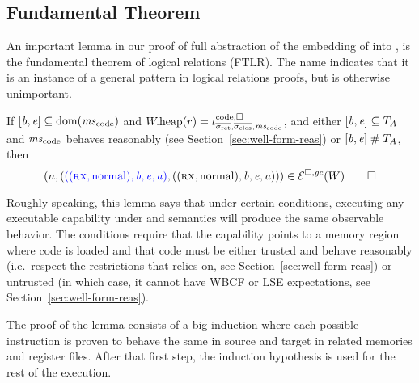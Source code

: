 \subsection{Fundamental Theorem}
An important lemma in our proof of full abstraction of the embedding of \srccm{} into \trgcm{}, is the fundamental theorem of logical relations (FTLR).
The name indicates that it is an instance of a general pattern in logical relations proofs, but is otherwise unimportant.
\begin{lemma}
  \label{thm:ftlr}
  If $[\baddr,\eaddr] \subseteq \dom(\mscode)$ and $\pwheap(r) = \codereg{\sigrets,\sigcloss,\mscode}$, and either $[\mathit{b},\mathit{e}] \subseteq T_{A}$ and $\mscode$ behaves reasonably (see Section~\ref{sec:well-form-reas}) or
$[\mathit{b},\mathit{e}] \mathrel{\#} T_{A}$,
then 
  \[
    \left(n,\left({\color{blue} ((\textsc{rx},\mathrm{normal}),\mathit{b},\mathit{e},\mathit{a})}, ((\textsc{rx},\mathrm{normal}),\mathit{b},\mathit{e},\mathit{a})\right)\right) \in \mathcal{E}^{\square,\mathit{gc}}(W) \qedhere
  \]
\end{lemma}

Roughly speaking, this lemma says that under certain conditions, executing any executable capability under \srccm{} and \trgcm{} semantics will produce the same observable behavior.
The conditions require that the capability points to a memory region where code is loaded and that code must be either trusted and behave reasonably (i.e.\ respect the restrictions that \stktokens{} relies on, see Section~\ref{sec:well-form-reas}) or untrusted (in which case, it cannot have WBCF or LSE expectations, see Section~\ref{sec:well-form-reas}).

The proof of the lemma consists of a big induction where each possible instruction is proven to behave the same in source and target in related memories and register files.
After that first step, the induction hypothesis is used for the rest of the execution.

